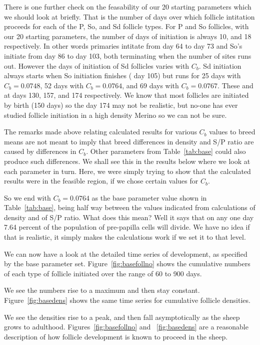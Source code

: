 \documentclass[titlepage]{article}  %
\begin{document}
There is one further check on the feasability of our 20 starting parameters which we should look at briefly. That is the number of days over which follicle intitation proceeds for each of the P, So, and Sd follicle types. For P and So follicles, with our 20 starting parameters, the number of days of initiation is always 10, and 18 respectively. In other words primaries intitate from day 64 to day 73 and So's initiate from day 86 to day 103, both terminating when the number of sites runs out. However the days of initiation of Sd follicles varies with $C_{b}$. Sd initiation always starts when So initiation finishes ( day 105) but runs for 25 days with $C_{b}=0.0748$, 52 days with $C_{b}=0.0764$, and 69 days with $C_{b}=0.0767$. These and at days 130, 157, and 174 respectively. We know that most follicles are initiated by birth (150 days) so the day 174 may not be realistic, but no-one has ever studied follicle initiation in a high density Merino so we can not be sure.

The remarks made above relating calculated results for various $C_{b}$ values to breed means are not meant to imply that breed differences  in density and S/P ratio are caused by differences in $C_{b}$. Other parameters from Table~\ref{tab:base} could also produce such differences. We shall see this in the results below where we look at each parameter in turn. Here, we were simply trying to show that the calculated results were in the feasible region, if we chose certain values for $C_{b}$.

So we end with $C_{b}=0.0764$ as the base parameter value shown in Table~\ref{tab:base}, being half way between the values indicated from calculations of density and of S/P ratio. What does this mean? Well it says that on any one day 7.64 percent of the population of pre-papilla cells will divide. We have no idea if that is realistic, it simply makes the calculations work if we set it to that level. 

We can now have a look at the detailed time series of development, as specified by the base parameter set. Figure~\ref{fig:basefollno} shows the cumulative numbers of each type of follicle initiated over the range of 60 to 900 days.

We see the numbers rise to a maximum and then stay constant.
Figure~\ref{fig:basedens} shows the same time series for cumulative follicle densities. 

We see the densities rise to a peak, and then fall asymptotically as the sheep grows to adulthood.
Figures~\ref{fig:basefollno} and ~\ref{fig:basedens} are a reasonable description of how follicle development is known to proceed in the sheep.
\end{document}
